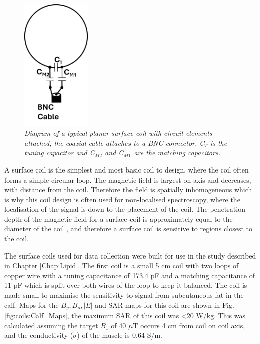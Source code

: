 \begin{figure}[H]
    \centering
    \includegraphics[width=0.3\textwidth]{Figures/Coils/Surface_Coil.png}
    \caption{\textit{Diagram of a typical planar surface coil with circuit elements attached, the coaxial cable attaches to a BNC connector. C$_T$ is the tuning capacitor and C$_{M2}$ and C$_{M1}$ are the matching capacitors.}}
    \label{fig:coils:Surface}
\end{figure}

A surface coil is the simplest and most basic coil to design, where the coil often forms a simple circular loop. The magnetic field is largest on axis and decreases, with distance from the coil. Therefore the field is spatially inhomogeneous which is why this coil design is often used for non-localised spectroscopy, where the localisation of the signal is down to the placement of the coil. The penetration depth of the magnetic field for a surface coil is approximately equal to the diameter of the coil \cite{Gruber2018RFNonphysicists}, and therefore a surface coil is sensitive to regions closest to the coil. 


The surface coils used for data collection were built for use in the study described in Chapter \ref{Chap:Lipid}. The first coil is a small 5 cm coil with two loops of copper wire with a tuning capacitance of 173.4 pF and a matching capacitance of 11 pF which is split over both wires of the loop to keep it balanced. The coil is made small to maximise the sensitivity to signal from subcutaneous fat in the calf. Maps for the $B_y, B_\rho, |E|$ and \ac{SAR} maps for this coil are shown in Fig. \ref{fig:coils:Calf_Maps}, the maximum \ac{SAR} of this coil was <20 W/kg. This was calculated assuming the target $B_1$ of 40 $\mu$T occurs 4 cm from coil on coil axis, and the conductivity ($\sigma$) of the muscle is 0.64 S/m.

